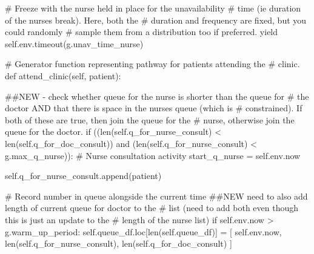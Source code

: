 \documentclass[
  letterpaper,
  DIV=11,
  numbers=noendperiod]{scrreprt}
\newenvironment{Shaded}{\begin{snugshade}}{\end{snugshade}}
\newcommand{\BuiltInTok}[1]{\textcolor[rgb]{0.00,0.23,0.31}{#1}}
\newcommand{\CommentTok}[1]{\textcolor[rgb]{0.37,0.37,0.37}{#1}}
\newcommand{\ControlFlowTok}[1]{\textcolor[rgb]{0.00,0.23,0.31}{#1}}
\newcommand{\KeywordTok}[1]{\textcolor[rgb]{0.00,0.23,0.31}{#1}}
\newcommand{\NormalTok}[1]{\textcolor[rgb]{0.00,0.23,0.31}{#1}}
\newcommand{\OperatorTok}[1]{\textcolor[rgb]{0.37,0.37,0.37}{#1}}
\newcommand{\VariableTok}[1]{\textcolor[rgb]{0.07,0.07,0.07}{#1}}
\begin{document}
\begin{tcolorbox}
\begin{Shaded}
\begin{Highlighting}[]
                \CommentTok{\# Freeze with the nurse held in place for the unavailability}
                \CommentTok{\# time (ie duration of the nurse\textquotesingle{}s break).  Here, both the}
                \CommentTok{\# duration and frequency are fixed, but you could randomly}
                \CommentTok{\# sample them from a distribution too if preferred.}
                \ControlFlowTok{yield} \VariableTok{self}\NormalTok{.env.timeout(g.unav\_time\_nurse)}

    \CommentTok{\# Generator function representing pathway for patients attending the}
    \CommentTok{\# clinic.}
    \KeywordTok{def}\NormalTok{ attend\_clinic(}\VariableTok{self}\NormalTok{, patient):}

        \CommentTok{\#\#NEW {-} check whether queue for the nurse is shorter than the queue for}
        \CommentTok{\# the doctor AND that there is space in the nurse\textquotesingle{}s queue (which is}
        \CommentTok{\# constrained).  If both of these are true, then join the queue for the}
        \CommentTok{\# nurse, otherwise join the queue for the doctor.}
        \ControlFlowTok{if}\NormalTok{ ((}\BuiltInTok{len}\NormalTok{(}\VariableTok{self}\NormalTok{.q\_for\_nurse\_consult) }\OperatorTok{\textless{}} \BuiltInTok{len}\NormalTok{(}\VariableTok{self}\NormalTok{.q\_for\_doc\_consult)) }\KeywordTok{and}
\NormalTok{            (}\BuiltInTok{len}\NormalTok{(}\VariableTok{self}\NormalTok{.q\_for\_nurse\_consult) }\OperatorTok{\textless{}}\NormalTok{ g.max\_q\_nurse)):}
            \CommentTok{\# Nurse consultation activity}
\NormalTok{            start\_q\_nurse }\OperatorTok{=} \VariableTok{self}\NormalTok{.env.now}

            \VariableTok{self}\NormalTok{.q\_for\_nurse\_consult.append(patient)}

            \CommentTok{\# Record number in queue alongside the current time}
            \CommentTok{\#\#NEW need to also add length of current queue for doctor to the}
            \CommentTok{\# list (need to add both even though this is just an update to the}
            \CommentTok{\# length of the nurse list)}
            \ControlFlowTok{if} \VariableTok{self}\NormalTok{.env.now }\OperatorTok{\textgreater{}}\NormalTok{ g.warm\_up\_period:}
                \VariableTok{self}\NormalTok{.queue\_df.loc[}\BuiltInTok{len}\NormalTok{(}\VariableTok{self}\NormalTok{.queue\_df)] }\OperatorTok{=}\NormalTok{ [}
                    \VariableTok{self}\NormalTok{.env.now,}
                    \BuiltInTok{len}\NormalTok{(}\VariableTok{self}\NormalTok{.q\_for\_nurse\_consult),}
                    \BuiltInTok{len}\NormalTok{(}\VariableTok{self}\NormalTok{.q\_for\_doc\_consult)}
\NormalTok{                ]}


\end{Highlighting}
\end{Shaded}
\end{tcolorbox}
\end{document}
